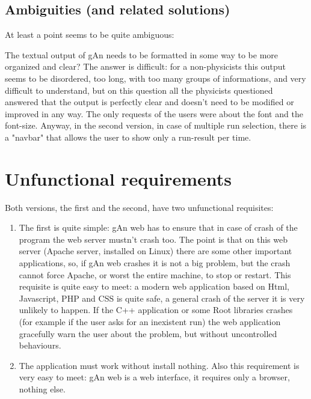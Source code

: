 \subsection{Ambiguities (and related solutions)}

At least a point seems to be quite ambiguous: 


The textual output of gAn needs to be formatted in some way to be more organized and clear? 
The answer is difficult: for a non-physicists this output seems to be disordered, too long, with too many groups of informations, and very difficult to understand, but on this question all the physicists questioned answered that the output is perfectly clear and doesn't need to be modified or improved in any way. The only requests of the users were about the font and the font-size. Anyway, in the second version, in case of multiple run selection, there is a "navbar" that allows the user to show only a run-result per time.


\section{Unfunctional requirements}

Both versions, the first and the second, have two unfunctional requisites:

\begin{enumerate}

\item The first is quite simple: gAn web has to ensure that in case of crash of the program the web server mustn't crash too. The point is that on this web server (Apache server, installed on Linux) there are some other important applications, so, if gAn web crashes it is not a big problem, but the crash cannot force Apache, or worst the entire machine, to stop or restart. 
This requisite is quite easy to meet: a modern web application based on Html, Javascript, PHP and CSS is quite safe, a general crash of the server it is very unlikely to happen. If the C++ application or some Root libraries crashes (for example if the user asks for an inexistent run) the web application gracefully warn the user about the problem, but without uncontrolled behaviours.  

\item The application must work without install nothing. Also this requirement is very easy to meet: gAn web is a web interface, it requires only a browser, nothing else.

\end{enumerate}


